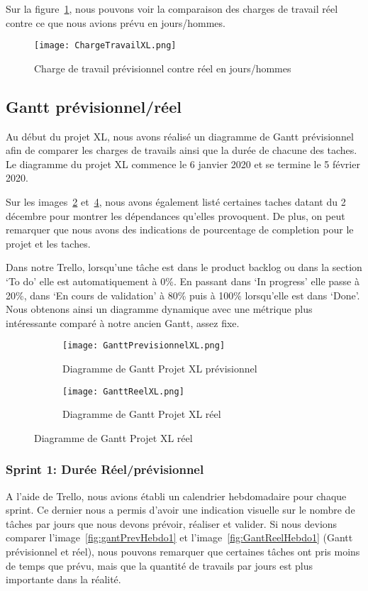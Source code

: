 Sur la figure~\ref{fig:chargeReel}, nous pouvons voir la comparaison des charges de travail réel contre ce que nous avions prévu en jours/hommes.

\begin{figure}[h!]
  \centering
  \texttt{[image: ChargeTravailXL.png]}
	\caption[]{Charge de travail prévisionnel contre réel en jours/hommes}
	\label{fig:chargeReel}
\end{figure}



\subsection{Gantt prévisionnel/réel}
Au début du projet XL, nous avons réalisé un diagramme de Gantt prévisionnel afin de comparer les charges de travails ainsi que la durée de chacune des taches.
Le diagramme du projet XL commence le 6 janvier 2020 et se termine le 5 février 2020. 

Sur les images~\ref{fig:gantXLprev} et~\ref{fig:gantXLreel}, nous avons également listé certaines taches datant du 2 décembre pour montrer les dépendances qu'elles provoquent.
De plus, on peut remarquer que nous avons des indications de pourcentage de completion pour le projet et les taches.

Dans notre Trello, lorsqu'une tâche est dans le product backlog ou dans la section `To do' elle est automatiquement à 0\%.
En passant dans `In progress' elle passe à 20\%, dans `En cours de validation' à 80\% puis à 100\% lorsqu'elle est dans `Done'.
Nous obtenons ainsi un diagramme dynamique avec une métrique plus intéressante comparé à notre ancien Gantt, assez fixe.

\begin{figure}
   \centering
   \begin{subfigure}{.5\textwidth}
     \centering
     \texttt{[image: GanttPrevisionnelXL.png]}
   	\caption{Diagramme de Gantt Projet XL prévisionnel}
   	\label{fig:gantXLprev}
   \end{subfigure}%
   \begin{subfigure}{.5\textwidth}
     \centering
     \texttt{[image: GanttReelXL.png]}
   	\caption{Diagramme de Gantt Projet XL réel}
   	\label{fig:gantXLreel}
   \end{subfigure}
\end{figure}

\subsubsection{Sprint 1: Durée Réel/prévisionnel}
A l'aide de Trello, nous avions établi un calendrier hebdomadaire pour chaque sprint.
Ce dernier nous a permis d’avoir une indication visuelle sur le nombre de tâches par jours que nous devons prévoir, réaliser et valider.
Si nous devions comparer l'image~\ref{fig:gantPrevHebdo1} et l'image~\ref{fig:GantReelHebdo1} (Gantt prévisionnel et réel), nous pouvons remarquer que certaines tâches ont pris moins de temps que prévu, mais que la quantité de travails par jours est plus importante dans la réalité.

